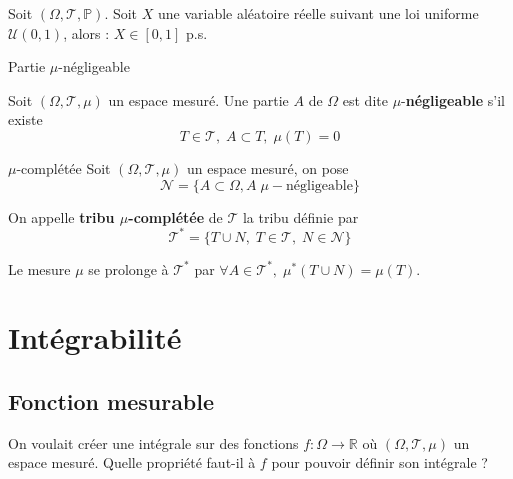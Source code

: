 \begin{Example}{}{}
Soit $(\Omega, \mathcal{T}, \mathbb{P})$. Soit $X$ une variable aléatoire réelle suivant une loi uniforme $\mathcal{U}(0,1)$, alors : $X \in [0,1]$ p.s.
\end{Example}

\begin{Definition}[colbacktitle=red!75!black]{Partie $\mu$-négligeable}{}

  Soit $(\Omega, \mathcal{T}, \mu)$ un espace mesuré. Une partie $A$ de $\Omega$ est dite $\mu$-\textbf{négligeable} s'il existe 
  \begin{equation}
    T \in \mathcal{T}, \; A \subset T, \; \mu(T) = 0
  \end{equation}
\end{Definition}


\begin{Definition}[colbacktitle=red!75!black]{$\mu$-complétée}{}
Soit $(\Omega, \mathcal{T}, \mu)$ un espace mesuré, on pose 
\begin{equation}
  \mathcal{N} = \{A \subset \Omega , A \;\mu-\text{négligeable}\}
\end{equation}



On appelle \textbf{tribu $\mu$-complétée} de $\mathcal{T}$ la tribu définie par 
\begin{equation}
  \boxed{\mathcal{T} ^{*} = \{ T \cup N,\; T \in \mathcal{T}, \; N \in \mathcal{N}\}}
\end{equation}

Le mesure $\mu$ se prolonge à $\mathcal{T} ^{*}$ par $\forall A \in \mathcal{T} ^{*}, \; \mu ^{*}(T \cup N) = \mu(T)$.
\end{Definition}




\newpage

\section{Intégrabilité} %
\label{sec:Intégrabilité}

\subsection{Fonction mesurable} %
\label{sub:Fonction mesurable}

\begin{tcolorbox}
    On voulait créer une intégrale sur des fonctions $f: \Omega \to \mathbb{R}$ où $(\Omega, \mathcal{T},\mu)$ un espace mesuré. Quelle propriété faut-il à $f$ pour pouvoir définir son intégrale ?
\end{tcolorbox}

